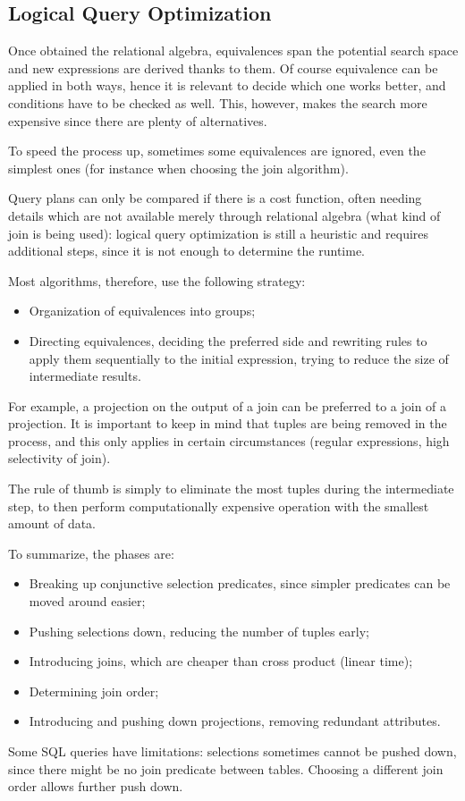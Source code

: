 \subsection{Logical Query Optimization}
Once obtained the relational algebra, equivalences span the potential search space and new expressions are derived thanks to them. Of course equivalence can be applied in both ways, hence it is relevant to decide which one works better, and conditions have to be checked as well. This, however, makes the search more expensive since there are plenty of alternatives.

To speed the process up, sometimes some equivalences are ignored, even the simplest ones (for instance when choosing the join algorithm).

Query plans can only be compared if there is a cost function, often needing details which are not available merely through relational algebra (what kind of join is being used): logical query optimization is still a heuristic and requires additional steps, since it is not enough to determine the runtime.

Most algorithms, therefore, use the following strategy:
\begin{itemize}
	\item Organization of equivalences into groups;
	\item Directing equivalences, deciding the preferred side and rewriting rules to apply them sequentially to the initial expression, trying to reduce the size of intermediate results.
\end{itemize}
For example, a projection on the output of a join can be preferred to a join of a projection. It is important to keep in mind that tuples are being removed in the process, and this only applies in certain circumstances (regular expressions, high selectivity of join).

The rule of thumb is simply to eliminate the most tuples during the intermediate step, to then perform computationally expensive operation with the smallest amount of data.

To summarize, the phases are:
\begin{itemize}
	\item Breaking up conjunctive selection predicates, since simpler predicates can be moved around easier;
	\item Pushing selections down, reducing the number of tuples early;
	\item Introducing joins, which are cheaper than cross product (linear time);
	\item Determining join order;
	\item Introducing and pushing down projections, removing redundant attributes.
\end{itemize}
Some SQL queries have limitations: selections sometimes cannot be pushed down, since there might be no join predicate between tables. Choosing a different join order allows further push down. 

